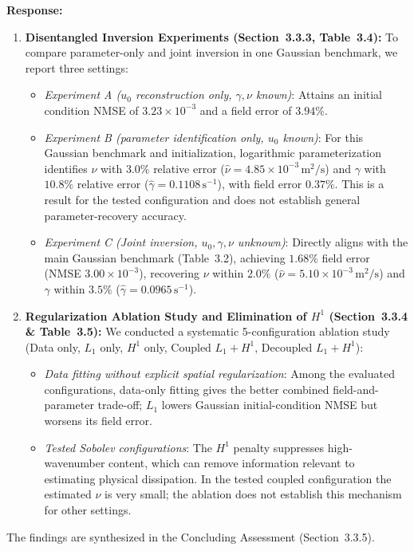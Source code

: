 \documentclass[11pt,a4paper]{article}
\newenvironment{response}{
    \par\vspace{1mm}\noindent\textbf{\textcolor{responseframe}{Response:}}\par\vspace{1mm}
}{
    \par\vspace{3mm}
}
\begin{document}
\begin{response}
\begin{enumerate}
\begin{itemize}
    \end{itemize}
    \item \textbf{Disentangled Inversion Experiments (Section~3.3.3, Table~3.4):} To compare parameter-only and joint inversion in one Gaussian benchmark, we report three settings:
    \begin{itemize}
        \item \emph{Experiment A ($u_0$ reconstruction only, $\gamma, \nu$ known)}: Attains an initial condition NMSE of $3.23 \times 10^{-3}$ and a field error of $3.94\%$.
        \item \emph{Experiment B (parameter identification only, $u_0$ known)}: For this Gaussian benchmark and initialization, logarithmic parameterization identifies $\nu$ with $3.0\%$ relative error ($\hat{\nu} = 4.85 \times 10^{-3}\,\mathrm{m}^2/\mathrm{s}$) and $\gamma$ with $10.8\%$ relative error ($\hat{\gamma} = 0.1108\,\mathrm{s}^{-1}$), with field error $0.37\%$. This is a result for the tested configuration and does not establish general parameter-recovery accuracy.
        \item \emph{Experiment C (Joint inversion, $u_0, \gamma, \nu$ unknown)}: Directly aligns with the main Gaussian benchmark (Table~3.2), achieving $1.68\%$ field error (NMSE $3.00 \times 10^{-3}$), recovering $\nu$ within $2.0\%$ ($\hat{\nu} = 5.10 \times 10^{-3}\,\mathrm{m}^2/\mathrm{s}$) and $\gamma$ within $3.5\%$ ($\hat{\gamma} = 0.0965\,\mathrm{s}^{-1}$).
    \end{itemize}
    \item \textbf{Regularization Ablation Study and Elimination of $H^1$ (Section~3.3.4 \& Table~3.5):} We conducted a systematic 5-configuration ablation study (Data only, $L_1$ only, $H^1$ only, Coupled $L_1+H^1$, Decoupled $L_1+H^1$):
    \begin{itemize}
        \item \emph{Data fitting without explicit spatial regularization}: Among the evaluated configurations, data-only fitting gives the better combined field-and-parameter trade-off; $L_1$ lowers Gaussian initial-condition NMSE but worsens its field error.
        \item \emph{Tested Sobolev configurations}: The $H^1$ penalty suppresses high-wavenumber content, which can remove information relevant to estimating physical dissipation. In the tested coupled configuration the estimated $\nu$ is very small; the ablation does not establish this mechanism for other settings.
    \end{itemize}
\end{enumerate}
The findings are synthesized in the Concluding Assessment (Section~3.3.5).
\end{response}
\end{document}
